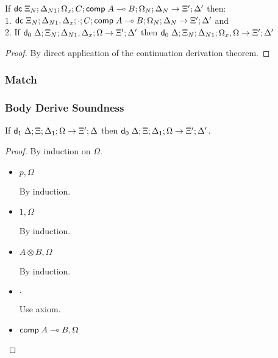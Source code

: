 If $\mathsf{dc} \; \Xi_N; \Delta_{N1}; \Omega_x; C; \mathsf{comp} \; A \multimap B; \Omega_N; \Delta_N \rightarrow \Xi'; \Delta'$ then: \\
1. \hspace{1cm} $\mathsf{dc} \; \Xi_N; \Delta_{N1}, \Delta_x; \cdot; C; \mathsf{comp} \; A \multimap B; \Omega_N; \Delta_N \rightarrow \Xi'; \Delta'$ and \\
2. \hspace{1cm} If $\mathsf{d}_0 \; \Delta; \Xi_N; \Delta_{N1}, \Delta_x; \Omega \rightarrow \Xi'; \Delta'$ then $\mathsf{d}_0 \; \Delta; \Xi_N; \Delta_{N1}; \Omega_x, \Omega \rightarrow \Xi'; \Delta'$

\begin{proof}
   By direct application of the continuation derivation theorem.
\end{proof}

\subsubsection{Match}

\subsubsection{Body Derive Soundness}

If $\mathsf{d}_1 \; \Delta; \Xi; \Delta_1; \Omega \rightarrow \Xi'; \Delta$ then $\mathsf{d}_0 \; \Delta; \Xi; \Delta_1; \Omega \rightarrow \Xi'; \Delta'$.

\begin{proof}
   By induction on $\Omega$.
   
   \begin{itemize}
      \item $p, \Omega$
      
      By induction.
      
      \item $1, \Omega$
      
      By induction.
      
      \item $A \otimes B, \Omega$
      
      By induction.
      
      \item $\cdot$
      
      Use axiom.
      
      \item $\mathsf{comp} \; A \multimap B, \Omega$
   \end{itemize}
\end{proof}